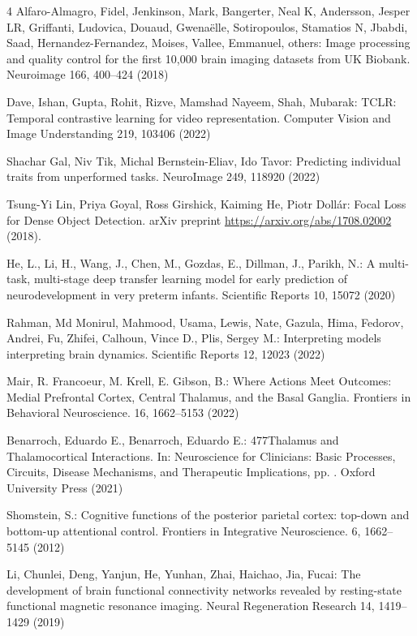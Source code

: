 \documentclass[runningheads,a4paper]{llncs}
\begin{document}
\begin{thebibliography}{4}
 Alfaro-Almagro, Fidel, Jenkinson, Mark, Bangerter, Neal K, Andersson, Jesper LR, Griffanti, Ludovica, Douaud, Gwena{\"e}lle, Sotiropoulos, Stamatios N, Jbabdi, Saad, Hernandez-Fernandez, Moises, Vallee, Emmanuel, others: Image processing and quality control for the first 10,000 brain imaging datasets from UK Biobank. Neuroimage 166, 400--424 (2018)

 Dave, Ishan, Gupta, Rohit, Rizve, Mamshad Nayeem, Shah, Mubarak: TCLR: Temporal contrastive learning for video representation. Computer Vision and Image Understanding 219, 103406 (2022)

 Shachar Gal, Niv Tik, Michal Bernstein-Eliav, Ido Tavor: Predicting individual traits from unperformed tasks. NeuroImage 249, 118920 (2022)

 Tsung-Yi Lin, Priya Goyal, Ross Girshick, Kaiming He, Piotr Dollár: Focal Loss for Dense Object Detection. arXiv preprint \url{https://arxiv.org/abs/1708.02002} (2018).

 He, L., Li, H., Wang, J., Chen, M., Gozdas, E., Dillman, J., Parikh, N.: A multi-task, multi-stage deep transfer learning model for early prediction of neurodevelopment in very preterm infants. Scientific Reports 10, 15072 (2020)

 Rahman, Md Monirul, Mahmood, Usama, Lewis, Nate, Gazula, Hima, Fedorov, Andrei, Fu, Zhifei, Calhoun, Vince D., Plis, Sergey M.: Interpreting models interpreting brain dynamics. Scientific Reports 12, 12023 (2022)

 Mair, R.  Francoeur, M.  Krell, E.  Gibson, B.: Where Actions Meet Outcomes: Medial Prefrontal Cortex, Central Thalamus, and the Basal Ganglia. Frontiers in Behavioral Neuroscience. 16, 1662--5153 (2022)

 Benarroch, Eduardo E., Benarroch, Eduardo E.: 477Thalamus and Thalamocortical Interactions. In: Neuroscience for Clinicians: Basic Processes, Circuits, Disease Mechanisms, and Therapeutic Implications, pp. . Oxford University Press (2021)

 Shomstein, S.: Cognitive functions of the posterior parietal cortex: top-down and bottom-up attentional control. Frontiers in Integrative Neuroscience. 6, 1662--5145 (2012)

 Li, Chunlei, Deng, Yanjun, He, Yunhan, Zhai, Haichao, Jia, Fucai: The development of brain functional connectivity networks revealed by resting-state functional magnetic resonance imaging. Neural Regeneration Research 14, 1419--1429 (2019)


\end{thebibliography}
\end{document}
